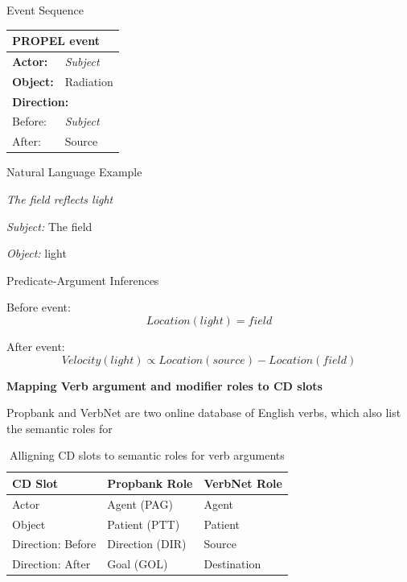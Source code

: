 \documentclass[../dissertation]{subfiles}
\begin{document}
Event Sequence

\begin{center}
	
	\bigskip
    
    \begin{tabular}{l l}
      \toprule
      \multicolumn{2}{l}{\textbf{PROPEL event}}\\
      \hline
      \textbf{Actor:} & \textit{Subject}\\
      \textbf{Object:} & Radiation\\
      
      \multicolumn{2}{l}{\textbf{Direction:}} \\
      Before: & \textit{Subject}\\
      After: & Source\\
      \bottomrule
    \end{tabular}
    
\end{center}

Natural Language Example

\textit{The field reflects light}

\textit{Subject:} The field

\textit{Object:} light

\bigskip

Predicate-Argument Inferences

Before event:
\[Location(light) = field\]

After event:
\[Velocity(light) \propto Location(source) - Location(field)\]



\textbf{Mapping Verb argument and modifier roles to CD slots}
\label{roles-to-slots}

Propbank and VerbNet are two online database of English verbs, which also list the semantic roles for 

\bigskip
\begin{table}
\begin{tabular}{l l l}
  \toprule
  CD Slot & Propbank Role & VerbNet Role \\
  \midrule
  Actor & Agent (PAG) & Agent\\
  Object & Patient (PTT) & Patient\\
  Direction: Before & Direction (DIR) & Source \\
  Direction: After &  Goal (GOL) & Destination \\
  \bottomrule
\end{tabular}
\caption{Alligning CD slots to semantic roles for verb arguments}
\end{table}
\end{document}
